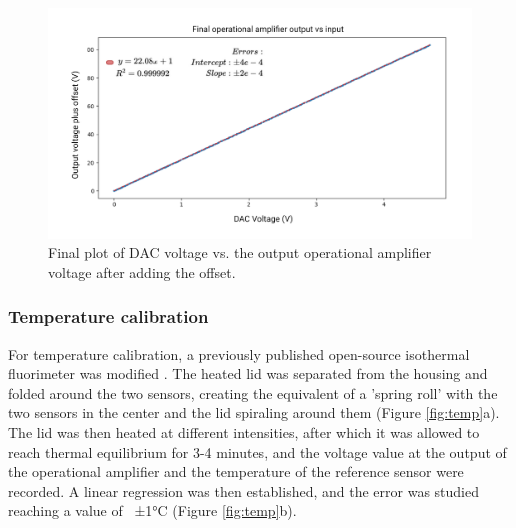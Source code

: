 \documentclass[conference]{IEEEtran}
\begin{document}
        \begin{figure}[h]
         \centering
         \includegraphics[width=1\linewidth]{images/finalop.png}
         \caption{Final plot of DAC voltage vs. the output operational amplifier voltage after adding the offset.}
         \label{fig:finalop}
      \end{figure}

      \subsubsection{Temperature calibration}

      For temperature calibration, a previously published open-source isothermal fluorimeter was modified \cite{Open_qLAMPMasterOpen2023}.
      The heated lid was separated from the housing and folded around the two sensors, creating the equivalent of a 'spring roll' with the two sensors 
      in the center and the lid spiraling around them (Figure \ref{fig:temp}a). The lid was then heated at different intensities, after which it was allowed to reach thermal 
      equilibrium for 3-4 minutes, and the voltage value at the output of the operational amplifier and the temperature of the reference sensor were recorded. 
      A linear regression was then established, and the error was studied reaching a value of ~±1°C (Figure \ref{fig:temp}b).
      
\end{document}
